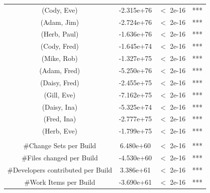 \begin{table}[t!]
\begin{tabular}{cccc}
(Cody, Eve)  	&   -2.315e+76  & $<$ 2e-16 &***\\
(Adam, Jim)  	&   -2.724e+76    & $<$ 2e-16 &***\\
(Herb, Paul)  	&   -1.636e+76      &$<$ 2e-16 &***\\
(Cody, Fred)  	&   -1.645e+74     & $<$ 2e-16 &***\\
(Mike, Rob)  	&   -1.327e+75    & $<$ 2e-16 &***\\
(Adam, Fred)  	&   -5.250e+76     & $<$ 2e-16 &***\\
(Daisy, Fred)  &   -2.455e+75      &$<$ 2e-16 &***\\
(Gill, Eve)	  	&   -7.162e+75    & $<$ 2e-16 &***\\
(Daisy, Ina)  	&   -5.325e+74      &$<$ 2e-16 &***\\
(Fred, Ina)  	&   -2.777e+75     & $<$ 2e-16 &***\\
(Herb, Eve)  	&   -1.799e+75     & $<$ 2e-16 &***\\
\\
\#Change Sets per Build     & \phantom{-}6.480e+60 &   $<$ 2e-16 &***\\
\#Files changed per Build            &-4.530e+60 &  $<$ 2e-16 &***\\
{\#Developers contributed per Build}  &   \phantom{-}3.386e+61 & $<$ 2e-16 &***\\
\#Work Items per Build    &  -3.690e+61   & $<$ 2e-16 &***\\
%
%
%

\end{tabular}
\end{table}
